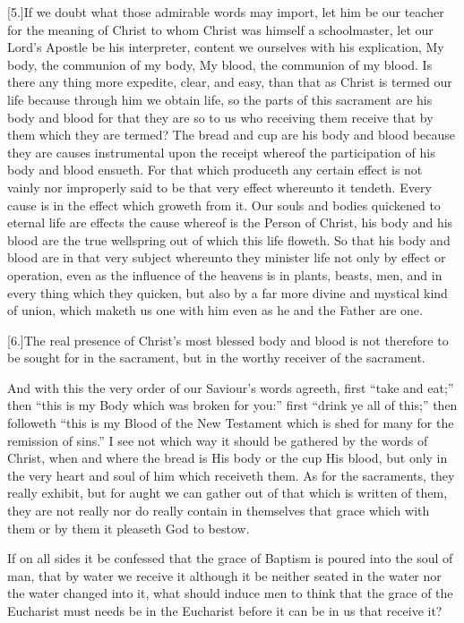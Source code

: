 [5.]If we doubt what those admirable words may import, let him be our teacher for the meaning of Christ to whom Christ was himself a schoolmaster, let our Lord’s Apostle be his interpreter, content we ourselves with his explication, My body, the communion of my body, My blood, the communion of my blood. Is there any thing more expedite, clear, and easy, than that as Christ is termed our life because through him we obtain life, so the parts of this sacrament are his body and blood for that they are so to us who receiving them receive that by them which they are termed? The bread and cup are his body and blood because they are causes instrumental upon the receipt whereof the participation of his body and blood ensueth. For that which produceth any certain effect is not vainly nor improperly said to be that very effect whereunto it tendeth. Every cause is in the effect which groweth from it. Our souls and bodies quickened to eternal life are effects the cause whereof is the Person of Christ, his body and his blood are the true wellspring out of which this life floweth. So that his body and blood are in that very subject whereunto they minister life not only by effect or operation, even as the influence of the heavens is in plants, beasts, men, and in every thing which they quicken, but also by a far more divine and mystical kind of union, which maketh us one with him even as he and the Father are one.

[6.]The real presence of Christ’s most blessed body and blood is not therefore to be sought for in the sacrament, but in the worthy receiver of the sacrament.

And with this the very order of our Saviour’s words agreeth, first “take and eat;” then “this is my Body which was broken for you:” first “drink ye all of this;” then followeth “this is my Blood of the New Testament which is shed for many for the remission of sins.” I see not which way it should be gathered by the words of Christ, when and where the bread is His body or the cup His blood, but only in the very heart and soul of him which receiveth them. As for the sacraments, they really exhibit, but for aught we can gather out of that which is written of them, they are not really nor do really contain in themselves that grace which with them or by them it pleaseth God to bestow.




If on all sides it be confessed that the grace of Baptism is poured into the soul of man, that by water we receive it although it be neither seated in the water nor the water changed into it, what should induce men to think that the grace of the Eucharist must needs be in the Eucharist before it can be in us that receive it?

